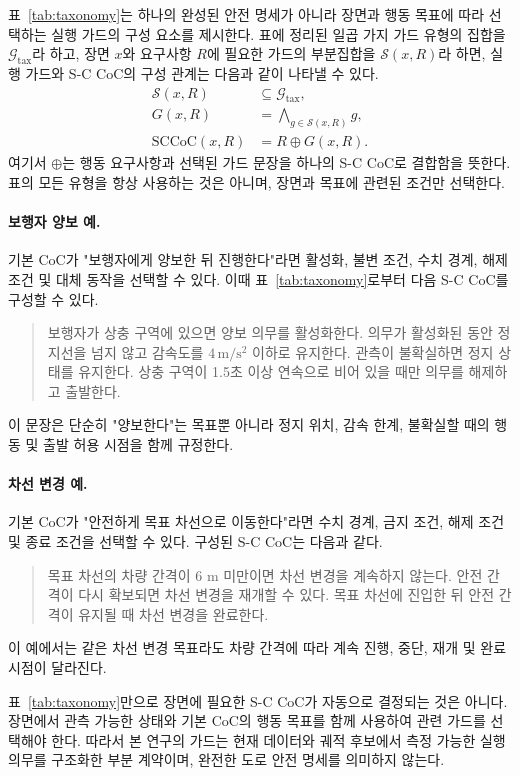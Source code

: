 표~\ref{tab:taxonomy}는 하나의 완성된 안전 명세가 아니라 장면과 행동 목표에 따라 선택하는 실행 가드의 구성 요소를 제시한다. 표에 정리된 일곱 가지 가드 유형의 집합을 $\mathcal{G}_{\mathrm{tax}}$라 하고, 장면 $x$와 요구사항 $R$에 필요한 가드의 부분집합을 $\mathcal{S}(x,R)$라 하면, 실행 가드와 S-C CoC의 구성 관계는 다음과 같이 나타낼 수 있다.
\begin{equation}
\begin{aligned}
\mathcal{S}(x,R)&\subseteq\mathcal{G}_{\mathrm{tax}},\\
G(x,R)&=\bigwedge_{g\in\mathcal{S}(x,R)}g,\\
\mathrm{SCCoC}(x,R)&=R\oplus G(x,R).
\end{aligned}
\label{eq:sccoc-compose}
\end{equation}
여기서 $\oplus$는 행동 요구사항과 선택된 가드 문장을 하나의 S-C CoC로 결합함을 뜻한다. 표의 모든 유형을 항상 사용하는 것은 아니며, 장면과 목표에 관련된 조건만 선택한다.

\paragraph{보행자 양보 예.}
기본 CoC가 "보행자에게 양보한 뒤 진행한다"라면 활성화, 불변 조건, 수치 경계, 해제 조건 및 대체 동작을 선택할 수 있다. 이때 표~\ref{tab:taxonomy}로부터 다음 S-C CoC를 구성할 수 있다.
\begin{quote}
\small
보행자가 상충 구역에 있으면 양보 의무를 활성화한다. 의무가 활성화된 동안 정지선을 넘지 않고 감속도를 $4\,\mathrm{m/s^2}$ 이하로 유지한다. 관측이 불확실하면 정지 상태를 유지한다. 상충 구역이 1.5초 이상 연속으로 비어 있을 때만 의무를 해제하고 출발한다.
\end{quote}
이 문장은 단순히 "양보한다"는 목표뿐 아니라 정지 위치, 감속 한계, 불확실할 때의 행동 및 출발 허용 시점을 함께 규정한다.

\paragraph{차선 변경 예.}
기본 CoC가 "안전하게 목표 차선으로 이동한다"라면 수치 경계, 금지 조건, 해제 조건 및 종료 조건을 선택할 수 있다. 구성된 S-C CoC는 다음과 같다.
\begin{quote}
\small
목표 차선의 차량 간격이 6 m 미만이면 차선 변경을 계속하지 않는다. 안전 간격이 다시 확보되면 차선 변경을 재개할 수 있다. 목표 차선에 진입한 뒤 안전 간격이 유지될 때 차선 변경을 완료한다.
\end{quote}
이 예에서는 같은 차선 변경 목표라도 차량 간격에 따라 계속 진행, 중단, 재개 및 완료 시점이 달라진다.

표~\ref{tab:taxonomy}만으로 장면에 필요한 S-C CoC가 자동으로 결정되는 것은 아니다. 장면에서 관측 가능한 상태와 기본 CoC의 행동 목표를 함께 사용하여 관련 가드를 선택해야 한다. 따라서 본 연구의 가드는 현재 데이터와 궤적 후보에서 측정 가능한 실행 의무를 구조화한 부분 계약이며, 완전한 도로 안전 명세를 의미하지 않는다.
